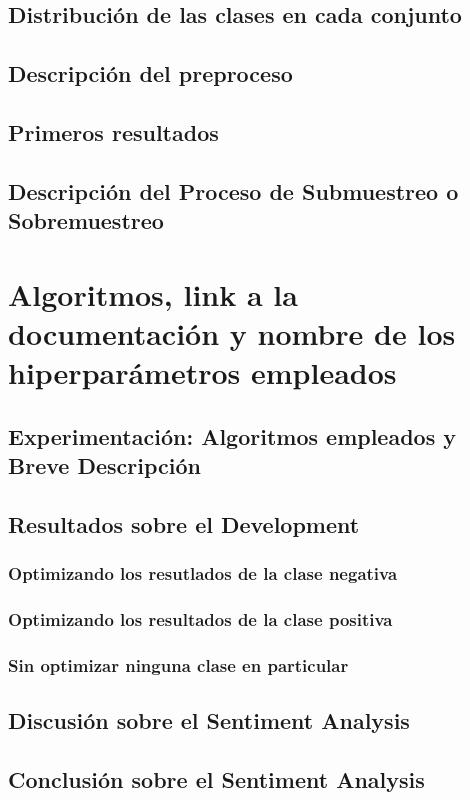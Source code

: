 \documentclass{report}
\begin{document}
            \subsection{Distribución de las clases en cada conjunto}
            \subsection{Descripción del preproceso}
            \subsection{Primeros resultados}
            \subsection{Descripción del Proceso de Submuestreo o Sobremuestreo}
        \section{Algoritmos, link a la documentación y nombre de los hiperparámetros empleados}
            \subsection{Experimentación: Algoritmos empleados y Breve Descripción}
            \subsection{Resultados sobre el Development}
                \subsubsection{Optimizando los resutlados de la clase negativa}
                \subsubsection{Optimizando los resultados de la clase positiva}
                \subsubsection{Sin optimizar ninguna clase en particular}
            \subsection{Discusión sobre el Sentiment Analysis}
            \subsection{Conclusión sobre el Sentiment Analysis}
\end{document}
